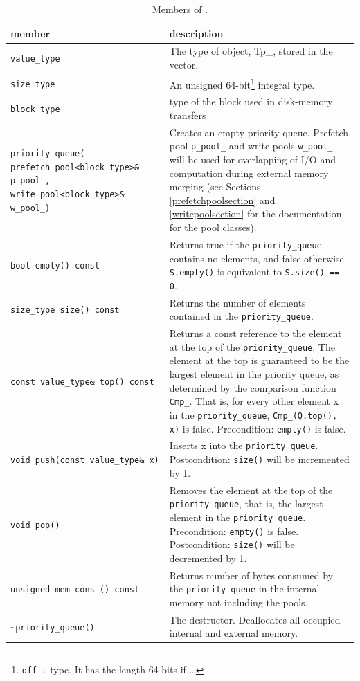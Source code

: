 \documentclass[twoside]{book}
\begin{document}
\begin{table}[h]
\begin{center}
\caption{Members of \xpqueue.}
\label{pqueuemembers}
\begin{tabular}{|p{6cm}|p{5cm}|}
\hline
member & description  \\
\hline\hline
\texttt{value\_type} &  The type of object, Tp\_, stored in the vector. \\
\hline
\texttt{size\_type} & An unsigned 64-bit\footnote{\texttt{off\_t}
type. It has the length 64 bits if \ldots} integral type. \\  
\hline
\texttt{block\_type} & type of the block used in disk-memory 
transfers \\
\hline
\texttt{priority\_queue( prefetch\_pool<block\_type>\& p\_pool\_, 
write\_pool<block\_type>\& w\_pool\_)} & Creates an empty priority
queue. Prefetch pool \texttt{p\_pool\_} and write pools
\texttt{w\_pool\_} will be used for overlapping of I/O and computation
during external memory merging (see Sections
\ref{prefetchpoolsection} and \ref{writepoolsection} for the
documentation for the pool classes).\\ 
\hline
\texttt{bool empty() const} & Returns true if the \texttt{priority\_queue}
contains no elements, and false  otherwise. \texttt{S.empty()} is
equivalent to \texttt{S.size() == 0}. \\ 
\hline
\texttt{size\_type size() const} & Returns the number of elements
contained in the \texttt{priority\_queue}. \\ 
\hline
\texttt{const value\_type\& top() const} & Returns a const reference to
the element at the top of the \texttt{priority\_queue}. The element at
the top 
is guaranteed to be the largest element in the priority queue, as
determined by the comparison function \texttt{Cmp\_}. That is, for
every 
other element x in the \texttt{priority\_queue}, \texttt{Cmp\_(Q.top(), x)} is
false. Precondition: \texttt{empty()} is false. \\
\hline
\texttt{void push(const value\_type\& x)}& Inserts x into the
\texttt{priority\_queue}. Postcondition: \texttt{size()} will be
incremented by 1.\\  
\hline
\texttt{void pop()} & Removes the element at the top of the
\texttt{priority\_queue}, that is, the largest element in the
\texttt{priority\_queue}. Precondition: \texttt{empty()} is
false. Postcondition: 
\texttt{size()} will be decremented by 1.  \\
\hline
\texttt{unsigned mem\_cons () const} & Returns number of bytes
consumed by the \texttt{priority\_queue} in the internal memory 
not including the pools.\\  
\hline
\texttt{\textasciitilde priority\_queue()} & The
destructor. Deallocates all occupied internal and external memory.\\
\hline
\end{tabular}
\end{center}
\end{table}
\end{document}
